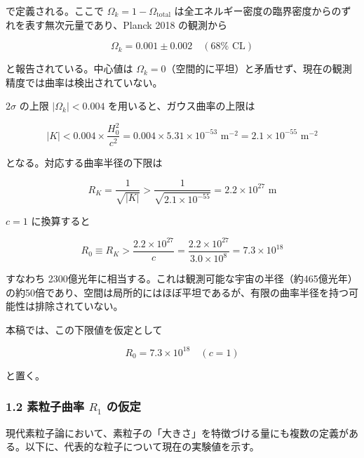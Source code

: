 \documentclass[
  a4paper,11pt]{ltjsarticle}
\theoremstyle{definition}
\theoremstyle{remark}
\begin{document}
で定義される。ここで \(\Omega_k = 1 - \Omega_{\mathrm{total}}\)
は全エネルギー密度の臨界密度からのずれを表す無次元量であり、Planck 2018
の観測から

\[\Omega_k = 0.001 \pm 0.002 \quad (68\% \text{ CL})\]

と報告されている。中心値は
\(\Omega_k = 0\)（空間的に平坦）と矛盾せず、現在の観測精度では曲率は検出されていない。

\(2\sigma\) の上限 \(\lvert \Omega_k \rvert < 0.004\)
を用いると、ガウス曲率の上限は

\[\lvert K \rvert < 0.004 \times \frac{H_0^2}{c^2} = 0.004 \times 5.31 \times 10^{-53} \text{ m}^{-2} = 2.1 \times 10^{-55} \text{ m}^{-2}\]

となる。対応する曲率半径の下限は

\[R_K = \frac{1}{\sqrt{\lvert K \rvert}} > \frac{1}{\sqrt{2.1 \times 10^{-55}}} = 2.2 \times 10^{27} \text{ m}\]

\(c = 1\) に換算すると

\[R_0 \equiv R_K > \frac{2.2 \times 10^{27}}{c} = \frac{2.2 \times 10^{27}}{3.0 \times 10^{8}} = 7.3 \times 10^{18}\]

すなわち
2300億光年に相当する。これは観測可能な宇宙の半径（約465億光年）の約50倍であり、空間は局所的にはほぼ平坦であるが、有限の曲率半径を持つ可能性は排除されていない。

本稿では、この下限値を仮定として

\[R_0 = 7.3 \times 10^{18} \quad (c = 1)\]

と置く。

\subsubsection{\texorpdfstring{1.2 素粒子曲率 \(R_1\)
の仮定}{1.2 素粒子曲率 R\_1 の仮定}}\label{ux7d20ux7c92ux5b50ux66f2ux7387-r_1-ux306eux4eeeux5b9a}

現代素粒子論において、素粒子の「大きさ」を特徴づける量にも複数の定義がある。以下に、代表的な粒子について現在の実験値を示す。
\end{document}

